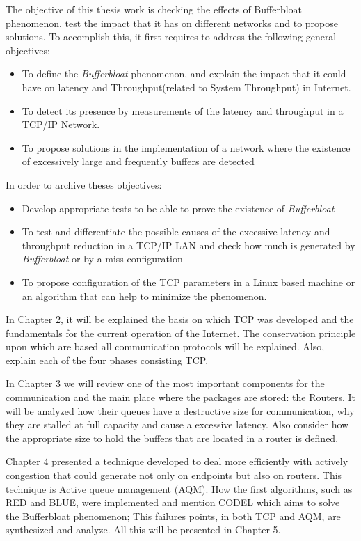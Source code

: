 The objective of this thesis work is checking the effects of
Bufferbloat phenomenon, test the impact that it has on different networks
and to propose solutions. To accomplish this, it first requires to
address the following general objectives:

\begin{itemize}
	\item To define the \textit{Bufferbloat} phenomenon, and explain the impact that it could have on latency and \gls{Throughput}(related to \gls{System Throughput}) in Internet.
	\item To detect its presence by measurements of the latency and throughput in a TCP/IP Network.
	\item To propose solutions in the implementation of a network where the existence of excessively large and frequently buffers are detected
\end{itemize}

In order to archive theses objectives:

\begin{itemize}
\item Develop appropriate tests to be able to prove the existence of \textit{Bufferbloat}
\item To test and differentiate the possible causes of the excessive latency and throughput reduction in a TCP/IP LAN and check how much is generated by \textit{Bufferbloat} or by a miss-configuration
\item To propose configuration of the TCP parameters in a Linux based machine or an algorithm that can help to minimize the phenomenon.
\end{itemize}

In Chapter 2, it will be explained the basis on which TCP was developed and
the fundamentals for the current operation of the Internet. The conservation
principle upon which are based all communication protocols will be explained.
Also, explain each of the four phases consisting TCP.

In Chapter 3 we will review one of the most important components for the
communication and the main place where the packages are stored: the Routers.
It will be analyzed how their queues have a destructive size for
communication, why they are stalled at full capacity and cause a excessive
latency. Also consider how the appropriate size to hold the buffers that are
located in a router is defined.

Chapter 4 presented a technique developed to deal more efficiently with
actively congestion that could generate not only on endpoints but also on
routers. This technique is Active queue management (AQM). How the first
algorithms, such as RED and BLUE, were implemented and mention
CODEL which aims to solve the Bufferbloat phenomenon; This failures points,
in both TCP and AQM, are synthesized and analyze. All this will be presented in
Chapter 5.

